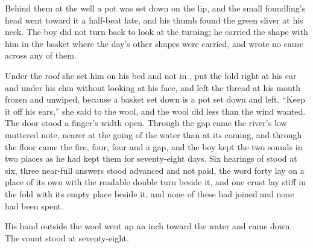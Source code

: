 Behind them at the well a pot was set down on the lip, and the small foundling’s head went toward it a half-beat late, and his thumb found the green sliver at his neck. The boy did not turn back to look at the turning; he carried the shape with him in the basket where the day’s other shapes were carried, and wrote no cause across any of them.

Under the roof she set him on his bed and not in , put the fold right at his ear and under his chin without looking at his face, and left the thread at his mouth frozen and unwiped, because a basket set down is a pot set down and left. “Keep it off his ears,” she said to the wool, and the wool did less than the wind wanted. The door stood a finger’s width open. Through the gap came the river’s low muttered note, nearer at the going of the water than at its coming, and through the floor came the fire, four, four and a gap, and the boy kept the two sounds in two places as he had kept them for seventy-eight days. Six hearings of  stood at six, three near-full answers stood advanced and not paid, the word forty lay on a place of its own with the readable double turn beside it, and one crust lay stiff in the fold with its empty place beside it, and none of these had joined and none had been spent.

His hand outside the wool went up an inch toward the water and came down. The count stood at seventy-eight.
